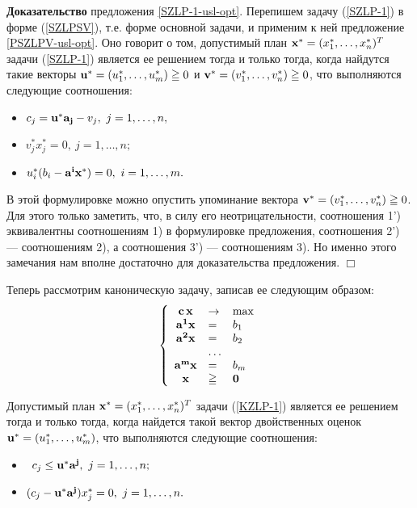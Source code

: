     \textbf{Доказательство} предложения \ref{SZLP-1-usl-opt}.
     Перепишем задачу (\ref{SZLP-1}) в
    форме (\ref{SZLPSV}), т.е. форме основной задачи, и применим к
    ней предложение \ref{PSZLPV-usl-opt}. Оно говорит о том,
    допустимый план $\mathbf{x}^{*}=(x_{1}^{*},\ldots,x_{n}^{*})^{T}$ задачи
    (\ref{SZLP-1}) является ее решением тогда и только тогда, когда найдутся такие
    векторы $\mathbf{u}^{*}=(u_{1}^{*},\ldots,u_{m}^{*})\geqq0$
    и $\mathbf{v}^{*}=(v_{1}^{*},\ldots,v_{n}^{*})\geqq0$, что выполняются
    следующие соотношения:
\begin{itemize}
    \item [1')\ ]
    $c_{j}=\vc{u}^{*}\vc{a_{j}}-v_{j}, \ j=1,\ldots,n,$
    \item [2')\ ]
    $v^{*}_{j}x_{j}^{*}=0, \ j=1,\ldots,n;$
    \item [3')\ ]
    $u_{i}^{*}(b_{i}-\vc{a^{i}}\vc{x}^{*})=0, \ i=1,\ldots,m.$
\end{itemize}

    В этой формулировке можно опустить упоминание вектора
    $\mathbf{v}^{*}=(v_{1}^{*},\ldots,v_{n}^{*})\geqq0$. Для этого
    только  заметить, что, в силу его неотрицательности,
    соотношения 1') эквивалентны соотношениям 1) в формулировке предложения,
    соотношения 2') --- соотношениям 2), а соотношения 3') --- соотношениям 3).
    Но именно этого замечания нам вполне достаточно для
    доказательства предложения. $\Box$

    Теперь рассмотрим каноническую задачу, записав ее следующим образом:
\begin{equation}\label{KZLP-1}
 \left\{
\begin{array}{cll}
     \mathbf{c} \, \mathbf{x} &\to & \max\\
     \mathbf{a^{1}}\mathbf{x} &=& b_1 \\
     \mathbf{a^{2}}\mathbf{x} &=& b_2\\
                      & \ldots &\\
     \mathbf{a^{m}}\mathbf{x}&=& b_m\\
     \mathbf{x} & \geqq & \mathbf{0}\\
\end{array} \right.
\end{equation}

\begin{prop}
    \label{KZLP-1-usl-opt}
    Допустимый план $\mathbf{x}^{*}=(x_{1}^{*},\ldots,x_{n}^{*})^{T}$ задачи
     (\ref{KZLP-1}) является ее решением
     тогда и только тогда, когда найдется такой вектор двойственных
     оценок
    $\mathbf{u}^{*}=(u_{1}^{*},\ldots,u_{m}^{*})$, что выполняются
    следующие соотношения:
\begin{itemize}
    \item [1)\ ] \
    $c_{j}\leq\vc{u}^{*}\vc{a^{j}}, \ j=1,\ldots,n;$
    \item [2)\ ]
    $(c_{j}-\vc{u}^{*}\vc{a^{j}})x_{j}^{*}=0, \ j=1,\ldots,n.$
\end{itemize}
\end{prop}

